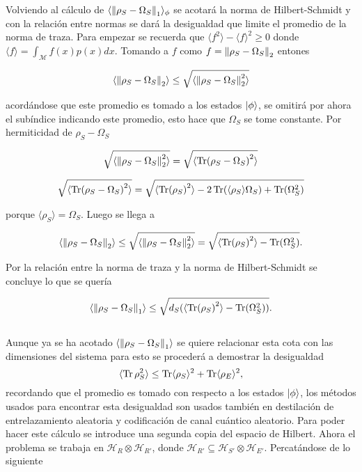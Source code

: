 Volviendo al cálculo de $\langle \norm{\rho_{S} -\Omega_{S}}_{1} \rangle_{\phi}$ se acotará la norma de Hilbert-Schmidt y con la relación entre normas se dará la desigualdad que limite el promedio de la norma de traza. Para empezar se recuerda que $ \langle f^{2} \rangle-\langle f \rangle^{2} \ge 0$ donde $\langle f \rangle = \int_{\mathcal{M}} f(x)p(x)dx$. Tomando a $f$ como $f= \norm{\rho_{S}-\Omega_{S}}_{2}$ entones

\begin{equation}
\langle \norm{ \rho_{S}-\Omega_{S} }_{2} \rangle \le \sqrt{ \langle \norm{ \rho_{S}-\Omega_{S} }_{2}^{2}\rangle}
\end{equation}

acordándose que este promedio es tomado a los estados $\ket{\phi}$, se omitirá por ahora el subíndice indicando este promedio, esto hace que $\Omega_{S}$ se tome constante. Por hermiticidad de $\rho_{S}-\Omega_{S}$ 

\begin{equation}
\sqrt{\langle \norm{ \rho_{S}-\Omega_{S} }_{2}^{2}\rangle} = \sqrt{\langle \Tr(\rho_{S}-\Omega_{S})^{2} \rangle}
\end{equation}

\begin{equation}
\sqrt{\langle \Tr( \rho_{S}-\Omega_{S})^{2} \rangle}= \sqrt{\langle \Tr(\rho_{S})^{2}\rangle -2 \Tr(\langle \rho_{S} \rangle \Omega_{S})+ \Tr(\Omega_{S}^{2}) }
\end{equation}

porque $\langle \rho_{S} \rangle=\Omega_{S}$. Luego se llega a

\begin{equation}
\langle \norm{ \rho_{S}-\Omega_{S} }_{2}\rangle \le \sqrt{\langle \norm{ \rho_{S}-\Omega_{S} }_{2}^{2}\rangle}= \sqrt{\langle \Tr(\rho_{S})^{2}\rangle - \Tr(\Omega_{S}^{2}) }.
\end{equation}

Por la relación entre la norma de traza y la norma de Hilbert-Schmidt se concluye lo que se quería

\begin{equation}
\langle \norm{ \rho_{S}-\Omega_{S} }_{1}\rangle \le \sqrt{d_{S}( \langle \Tr(\rho_{S})^{2}\rangle -\Tr(\Omega_{S}^{2}) ) }.
\end{equation}
\\
Aunque ya se ha acotado $\langle \norm{ \rho_{S}-\Omega_{S} }_{1}\rangle$ se quiere relacionar esta cota con las dimensiones del sistema para esto se procederá a demostrar la desigualdad
\begin{equation}
\langle \Tr \rho_{S}^{2} \rangle \le \Tr \langle \rho_{S} \rangle^{2} +\Tr \langle \rho_E \rangle^{2},
\end{equation}
recordando que el promedio es tomado con respecto a los estados $\ket{\phi}$, los métodos usados para encontrar esta desigualdad son usados también en destilación de entrelazamiento aleatoria y codificación de canal cuántico aleatorio. Para poder hacer este cálculo se introduce una segunda copia del espacio de Hilbert. Ahora el problema se trabaja en $\mathcal{H}_{R} \otimes \mathcal{H}_{R'}$, donde $\mathcal{H}_{R'} \subseteq \mathcal{H}_{S'} \otimes \mathcal{H}_{E'}$.
Percatándose de lo siguiente

